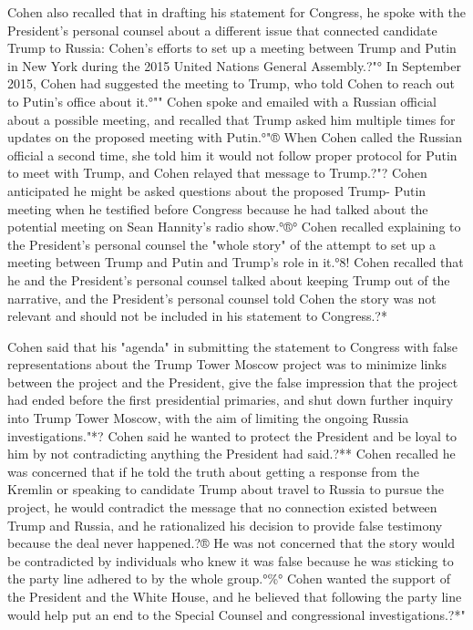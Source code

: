 Cohen also recalled that in drafting his statement for Congress, he spoke with the President's personal counsel about a different issue that connected candidate Trump to Russia: Cohen's efforts to set up a meeting between Trump and Putin in New York during the 2015 United Nations General Assembly.?"°
In September 2015, Cohen had suggested the meeting to Trump, who told Cohen to reach out to Putin's office about it.°""
Cohen spoke and emailed with a Russian official about a possible meeting, and recalled that Trump asked him multiple times for updates on the proposed meeting with Putin.°"®
When Cohen called the Russian official a second time, she told him it would not follow proper protocol for Putin to meet with Trump, and Cohen relayed that message to Trump.?"?
Cohen anticipated he might be asked questions about the proposed Trump- Putin meeting when he testified before Congress because he had talked about the potential meeting on Sean Hannity's radio show.°®°
Cohen recalled explaining to the President's personal counsel the "whole story" of the attempt to set up a meeting between Trump and Putin and Trump's role in it.°8!
Cohen recalled that he and the President's personal counsel talked about keeping Trump out of the narrative, and the President's personal counsel told Cohen the story was not relevant and should not be included in his statement to Congress.?*

Cohen said that his "agenda" in submitting the statement to Congress with false representations about the Trump Tower Moscow project was to minimize links between the project and the President, give the false impression that the project had ended before the first presidential primaries, and shut down further inquiry into Trump Tower Moscow, with the aim of limiting the ongoing Russia investigations."*?
Cohen said he wanted to protect the President and be loyal to him by not contradicting anything the President had said.?**
Cohen recalled he was concerned that if he told the truth about getting a response from the Kremlin or speaking to candidate Trump about travel to Russia to pursue the project, he would contradict the message that no connection existed between Trump and Russia, and he rationalized his decision to provide false testimony because the deal never happened.?®
He was not concerned that the story would be contradicted by individuals who knew it was false because he was sticking to the party line adhered to by the whole group.°\%°
Cohen wanted the support of the President and the White House, and he believed that following the party line would help put an end to the Special Counsel and congressional investigations.?*"

